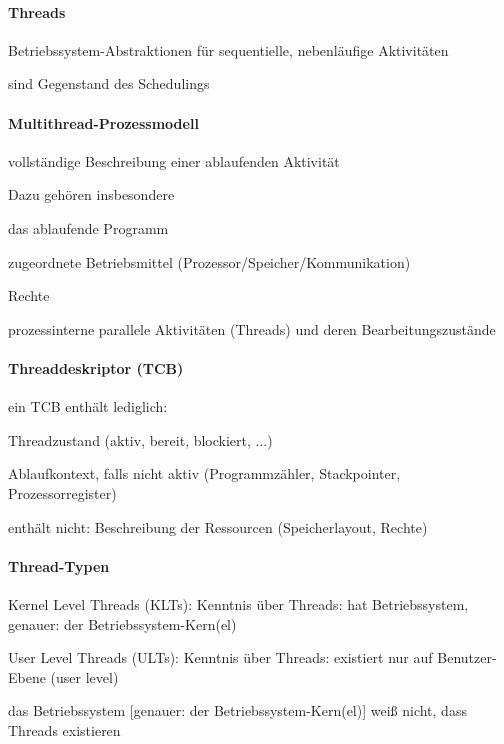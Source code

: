 \documentclass[a4pape]{article}
\begin{document}
\begin{multicols}{3}
  \paragraph{Threads}
  \begin{itemize*}
    \item Betriebssystem-Abstraktionen für sequentielle, nebenläufige Aktivitäten
    \item sind Gegenstand des Schedulings
  \end{itemize*}

  \paragraph{Multithread-Prozessmodell}
  \begin{itemize*}
    \item vollständige Beschreibung einer ablaufenden Aktivität
    \item Dazu gehören insbesondere
    \begin{enumerate*}
      \item das ablaufende Programm
      \item zugeordnete Betriebsmittel (Prozessor/Speicher/Kommunikation)
      \item Rechte
      \item prozessinterne parallele Aktivitäten (Threads) und deren Bearbeitungszustände
    \end{enumerate*}
  \end{itemize*}

  \paragraph{Threaddeskriptor (TCB)}
  \begin{itemize*}
    \item ein TCB enthält lediglich:
    \begin{enumerate*}
      \item Threadzustand (aktiv, bereit, blockiert, ...)
      \item Ablaufkontext, falls nicht aktiv (Programmzähler, Stackpointer, Prozessorregister)
    \end{enumerate*}
    \item enthält nicht: Beschreibung der Ressourcen (Speicherlayout, Rechte)
  \end{itemize*}

  \paragraph{Thread-Typen}
  \begin{itemize*}
    \item Kernel Level Threads (KLTs): Kenntnis über Threads: hat Betriebssystem, genauer: der Betriebssystem-Kern(el)
    \item User Level Threads (ULTs): Kenntnis über Threads: existiert nur auf Benutzer-Ebene (user level)
    \item das Betriebssystem [genauer: der Betriebssystem-Kern(el)] weiß nicht, dass Threads existieren
  \end{itemize*}


\end{multicols}
\end{document}
